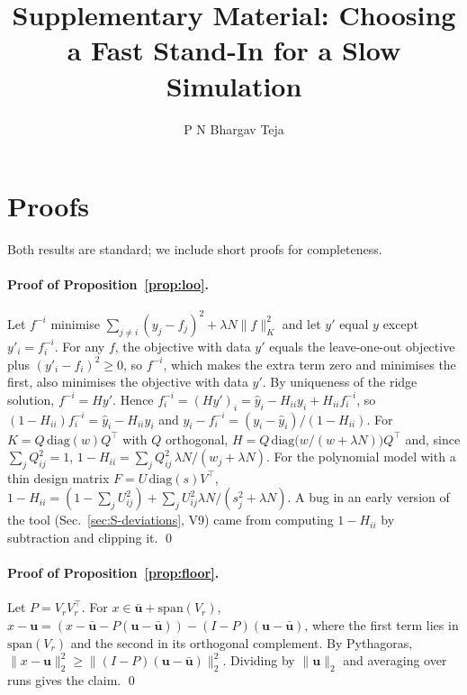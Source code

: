 \documentclass[preprint,11pt]{elsarticle}
\begin{document}
\begin{frontmatter}
\title{Supplementary Material: Choosing a Fast Stand-In for a Slow Simulation}
\author{P N Bhargav Teja}
\end{frontmatter}

\section{Proofs}\label{sec:S-proofs}
Both results are standard; we include short proofs for completeness.
\paragraph{Proof of Proposition~\ref{prop:loo}.} Let $f^{-i}$ minimise $\sum_{j\ne i}(y_j-f_j)^2+\lambda N\lVert f\rVert_K^2$ and let $y'$ equal $y$ except $y'_i=f^{-i}_i$. For any $f$, the objective with data $y'$ equals the leave-one-out objective plus $(y'_i-f_i)^2\ge0$, so $f^{-i}$, which makes the extra term zero and minimises the first, also minimises the objective with data $y'$. By uniqueness of the ridge solution, $f^{-i}=Hy'$. Hence $f^{-i}_i=(Hy')_i=\hat y_i-H_{ii}y_i+H_{ii}f^{-i}_i$, so $(1-H_{ii})f^{-i}_i=\hat y_i-H_{ii}y_i$ and $y_i-f^{-i}_i=(y_i-\hat y_i)/(1-H_{ii})$. For $K=Q\,\mathrm{diag}(w)Q^\top$ with $Q$ orthogonal, $H=Q\,\mathrm{diag}\big(w/(w+\lambda N)\big)Q^\top$ and, since $\sum_jQ_{ij}^2=1$, $1-H_{ii}=\sum_jQ_{ij}^2\,\lambda N/(w_j+\lambda N)$. For the polynomial model with a thin design matrix $F=U\,\mathrm{diag}(s)V^\top$, $1-H_{ii}=(1-\sum_jU_{ij}^2)+\sum_jU_{ij}^2\lambda N/(s_j^2+\lambda N)$. A bug in an early version of the tool (Sec.~\ref{sec:S-deviations}, V9) came from computing $1-H_{ii}$ by subtraction and clipping it. \qed
\paragraph{Proof of Proposition~\ref{prop:floor}.} Let $P=V_rV_r^\top$. For $x\in\bar{\mathbf u}+\mathrm{span}(V_r)$, $x-\mathbf u=(x-\bar{\mathbf u}-P(\mathbf u-\bar{\mathbf u}))-(I-P)(\mathbf u-\bar{\mathbf u})$, where the first term lies in $\mathrm{span}(V_r)$ and the second in its orthogonal complement. By Pythagoras, $\lVert x-\mathbf u\rVert_2^2\ge\lVert(I-P)(\mathbf u-\bar{\mathbf u})\rVert_2^2$. Dividing by $\lVert\mathbf u\rVert_2$ and averaging over runs gives the claim. \qed
\end{document}
